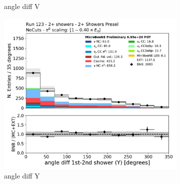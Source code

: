 \begin{figure}[H]
\begin{subfigure}{0.3\textwidth}
    \caption{angle diff V}
    \end{subfigure}
    \begin{subfigure}{0.3\textwidth}
    \includegraphics[width=1.0\textwidth]{Sidebands/Figures/TwoShr_1e0pSel/Presel/anglediff_Y.pdf}
    \caption{angle diff Y}
    \end{subfigure}
    \caption{} 
    \label{fig:HE_1eNp_1}
\end{figure}

